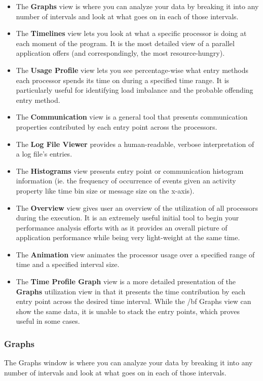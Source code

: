 \documentclass[10pt]{article}
\begin{document}
\begin{itemize}
\item 
The {\bf Graphs} view is where you can analyze your data by breaking it
into any number of intervals and look at what goes on in each of those
intervals.
\item
The {\bf Timelines} view lets you look at what a specific processor is
doing at each moment of the program. It is the most detailed view of a
parallel application \projections{} offers (and correspondingly, the
most resource-hungry).
\item
The {\bf Usage Profile} view lets you see percentage-wise what entry
methods each processor spends its time on during a specified time range.
It is particularly useful for identifying load imbalance and the probable
offending entry method.
\item
The {\bf Communication} view is a general tool that presents
communication properties contributed by each entry point across the
processors.
\item
The {\bf Log File Viewer} provides a human-readable, verbose
interpretation of a log file's entries.
\item
The {\bf Histograms} view presents entry point or communication
histogram information (ie. the frequency of occurrence of events given
an activity property like time bin size or message size on the
x-axis).
\item
The {\bf Overview} view gives user an overview of the utilization of
all processors during the execution. It is an extremely useful initial
tool to begin your performance analysis efforts with as it provides an
overall picture of application performance while being very
light-weight at the same time.
\item
The {\bf Animation} view animates the processor usage over a specified
range of time and a specified interval size.
\item
The {\bf Time Profile Graph} view is a more detailed presentation of
the {\bf Graphs} utilization view in that it presents the time
contribution by each entry point across the desired time
interval. While the {/bf Graphs} view can show the same data, it is
unable to stack the entry points, which proves useful in some cases.
\end{itemize}

\subsubsection{Graphs}
\label{sec::graph view}
The Graphs window is where you can analyze your data by breaking it
into any number of intervals and look at what goes on in each of those
intervals.
\end{document}
